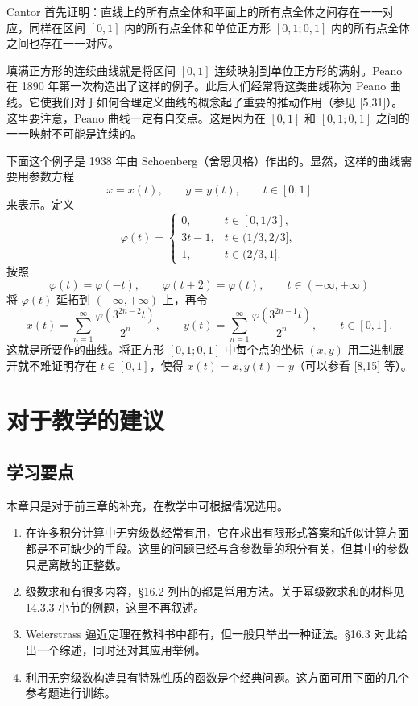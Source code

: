 Cantor 首先证明：直线上的所有点全体和平面上的所有点全体之间存在一一对应，同样在区间 $[0,1]$ 内的所有点全体和单位正方形 $[0,1;0,1]$ 内的所有点全体之间也存在一一对应。

填满正方形的连续曲线就是将区间 $[0,1]$ 连续映射到单位正方形的满射。Peano 在 1890 年第一次构造出了这样的例子。此后人们经常将这类曲线称为 Peano 曲线。它使我们对于如何合理定义曲线的概念起了重要的推动作用（参见 [5,31]）。这里要注意，Peano 曲线一定有自交点。这是因为在 $[0,1]$ 和 $[0,1;0,1]$ 之间的一一映射不可能是连续的。

下面这个例子是 1938 年由 Schoenberg（舍恩贝格）作出的。显然，这样的曲线需要用参数方程
\[
  x=x(t),\qquad y=y(t),\qquad t\in[0,1]
\]
来表示。定义
\[
  \varphi(t)=
  \begin{cases}
    0,&t\in[0,1/3],\\
    3t-1,&t\in(1/3,2/3],\\
    1,&t\in(2/3,1].
  \end{cases}
\]
按照
\[
  \varphi(t)=\varphi(-t),\qquad \varphi(t+2)=\varphi(t),\qquad t\in(-\infty,+\infty)
\]
将 $\varphi(t)$ 延拓到 $(-\infty,+\infty)$ 上，再令
\[
  x(t)=\sum_{n=1}^{\infty}\frac{\varphi(3^{2n-2}t)}{2^n},\qquad
  y(t)=\sum_{n=1}^{\infty}\frac{\varphi(3^{2n-1}t)}{2^n},\qquad t\in[0,1].
\]
这就是所要作的曲线。将正方形 $[0,1;0,1]$ 中每个点的坐标 $(x,y)$ 用二进制展开就不难证明存在 $t\in[0,1]$，使得 $x(t)=x,y(t)=y$（可以参看 [8,15] 等）。

\section{对于教学的建议}

\subsection{学习要点}

本章只是对于前三章的补充，在教学中可根据情况选用。

\begin{enumerate}[label=\arabic*.]
\item 在许多积分计算中无穷级数经常有用，它在求出有限形式答案和近似计算方面都是不可缺少的手段。这里的问题已经与含参数量的积分有关，但其中的参数只是离散的正整数。
\item 级数求和有很多内容，§16.2 列出的都是常用方法。关于幂级数求和的材料见 14.3.3 小节的例题，这里不再叙述。
\item Weierstrass 逼近定理在教科书中都有，但一般只举出一种证法。§16.3 对此给出一个综述，同时还对其应用举例。
\item 利用无穷级数构造具有特殊性质的函数是个经典问题。这方面可用下面的几个参考题进行训练。
\end{enumerate}

